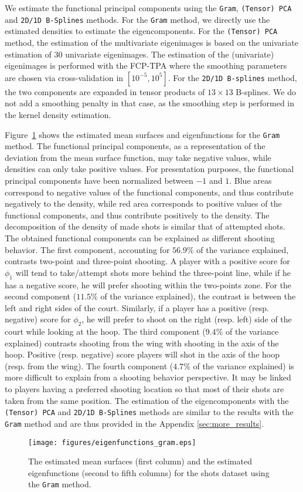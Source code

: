 We estimate the functional principal components using the \texttt{Gram}, \texttt{(Tensor) PCA} and \texttt{2D/1D B-Splines} methods. For the \texttt{Gram} method, we directly use the estimated densities to estimate the eigencomponents. For the \texttt{(Tensor) PCA} method, the estimation of the multivariate eigenimages is based on the univariate estimation of $30$ univariate eigenimages. The estimation of the (univariate) eigenimages is performed with the FCP-TPA where the smoothing parameters are chosen via cross-validation in $[10^{-5}, 10^5]$. For the \texttt{2D/1D B-splines} method, the two components are expanded in tensor products of $13 \times 13$ B-splines. We do not add a smoothing penalty in that case, as the smoothing step is performed in the kernel density estimation.

Figure~\ref{fig:eigenfunctions_gram} shows the estimated mean surfaces and eigenfunctions for the \texttt{Gram} method. The functional principal components, as a representation of the deviation from the mean surface function, may take negative values, while densities can only take positive values. For presentation purposes, the functional principal components have been normalized between $-1$ and $1$. Blue areas correspond to negative values of the functional components, and thus contribute negatively to the density, while red area corresponds to positive values of the functional components, and thus contribute positively to the density. The decomposition of the density of made shots is similar that of attempted shots. The obtained functional components can be explained as different shooting behavior. The first component, accounting for $56.9\%$ of the variance explained, contrasts two-point and three-point shooting. A player with a positive score for $\phi_1$ will tend to take/attempt shots more behind the three-point line, while if he has a negative score, he will prefer shooting within the two-points zone. For the second component ($11.5\%$ of the variance explained), the contrast is between the left and right sides of the court. Similarly, if a player has a positive (resp. negative) score for $\phi_2$, he will prefer to shoot on the right (resp. left) side of the court while looking at the hoop. The third component ($9.4\%$ of the variance explained) contrasts shooting from the wing with shooting in the axis of the hoop. Positive (resp. negative) score players will shot in the axis of the hoop (resp. from the wing). The fourth component ($4.7\%$ of the variance explained) is more difficult to explain from a shooting behavior perspective. It may be linked to players having a preferred shooting location so that most of their shots are taken from the same position. The estimation of the eigencomponents with the \texttt{(Tensor) PCA} and \texttt{2D/1D B-Splines} methods are similar to the results with the \texttt{Gram} method and are thus provided in the Appendix \ref{sec:more_results}. 
\begin{figure}
    \centering
    \texttt{[image: figures/eigenfunctions\_gram.eps]}
    \caption{The estimated mean surfaces (first column) and the estimated eigenfunctions (second to fifth columns) for the shots dataset using the \texttt{Gram} method.}
    \label{fig:eigenfunctions_gram}
\end{figure}

